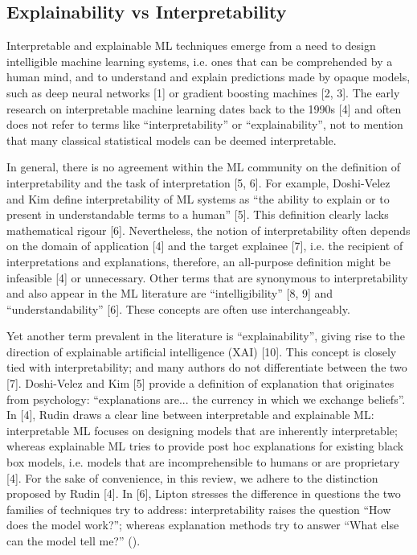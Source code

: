 \documentclass[binding=0.6cm]{sapthesis}
\newcommand{\mycite}[1]{(\cite{#1})}
\begin{document}
\subsection{Explainability vs Interpretability}
\label{sec:bg.xai.inter-vs-xai}
Interpretable and explainable ML techniques emerge from a need to design intelligible machine learning systems, i.e. ones that can be comprehended by a human mind, and to understand and explain predictions made by opaque models, such as deep neural networks [1] or gradient boosting machines [2, 3]. The early research on interpretable machine learning dates back to the 1990s [4] and often does not refer to terms like “interpretability” or “explainability”, not to mention that many classical statistical models can be deemed interpretable.

In general, there is no agreement within the ML community on the definition of interpretability and the task of interpretation [5, 6]. For example, Doshi-Velez and Kim define interpretability of ML systems as “the ability to explain or to present in understandable terms to a human” [5]. This definition clearly lacks mathematical rigour [6]. Nevertheless, the notion of interpretability often depends on the domain of application [4] and the target explainee [7], i.e. the recipient of interpretations and explanations, therefore, an all-purpose definition might be infeasible [4] or unnecessary. Other terms that are synonymous to interpretability and also appear in the ML literature are “intelligibility” [8, 9] and “understandability” [6]. These concepts are often use interchangeably.

Yet another term prevalent in the literature is “explainability”, giving rise to the direction of explainable artificial intelligence (XAI) [10]. This concept is closely tied with interpretability; and many authors do not differentiate between the two [7]. Doshi-Velez and Kim [5] provide a definition of explanation that originates from psychology: “explanations are... the currency in which we exchange beliefs”. In [4], Rudin draws a clear line between interpretable and explainable ML: interpretable ML focuses on designing models that are inherently interpretable; whereas explainable ML tries to provide post hoc explanations for existing black box models, i.e. models that are incomprehensible to humans or are proprietary [4]. For the sake of convenience, in this review, we adhere to the distinction proposed by Rudin [4]. In [6], Lipton stresses the difference in questions the two families of techniques try to address: interpretability raises the question “How does the model work?”;
whereas explanation methods try to answer “What else can the model tell me?” \mycite{marcinkevičs2023-inter-vs-XAI}.
\end{document}
